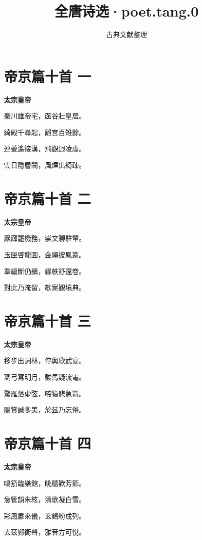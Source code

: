 \documentclass[12pt,a4paper]{ctexbook}
\title{全唐诗选·poet.tang.0}
\author{古典文献整理}
\date{}
\begin{document}
\maketitle
\tableofcontents
\newpage
\section{帝京篇十首 一}
\textbf{太宗皇帝}\par\vspace{0.5em}
秦川雄帝宅，函谷壯皇居。\par
綺殿千尋起，離宮百雉餘。\par
連甍遙接漢，飛觀迥凌虛。\par
雲日隱層闕，風煙出綺疎。\par

\section{帝京篇十首 二}
\textbf{太宗皇帝}\par\vspace{0.5em}
巖廊罷機務，崇文聊駐輦。\par
玉匣啓龍圖，金繩披鳳篆。\par
韋編斷仍續，縹帙舒還卷。\par
對此乃淹留，欹案觀墳典。\par

\section{帝京篇十首 三}
\textbf{太宗皇帝}\par\vspace{0.5em}
移步出詞林，停輿欣武宴。\par
琱弓寫明月，駿馬疑流電。\par
驚雁落虛弦，啼猿悲急箭。\par
閱賞誠多美，於茲乃忘倦。\par

\section{帝京篇十首 四}
\textbf{太宗皇帝}\par\vspace{0.5em}
鳴笳臨樂館，眺聽歡芳節。\par
急管韻朱絃，清歌凝白雪。\par
彩鳳肅來儀，玄鶴紛成列。\par
去茲鄭衛聲，雅音方可悅。\par
\end{document}
